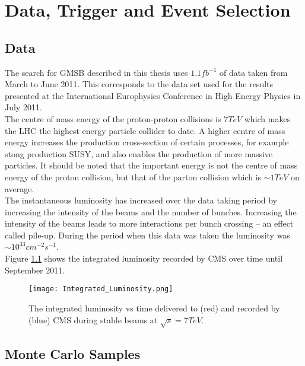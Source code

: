\chapter{Data, Trigger and Event Selection}

\section{Data}

The search for GMSB described in this thesis uses $1.1 \unit{fb^{-1}}$ of data 
taken from March to June 2011. This corresponds to the data set used for the 
results presented at the International Europhysics Conference in High Energy 
Physics in July 2011. \\

The centre of mass energy of the proton-proton collisions is $7\unit{TeV}$ which
makes the LHC the highest energy particle collider to date. A higher centre of 
mass energy increases the production cross-section of certain processes, for 
example stong production SUSY, and also enables the production of more massive 
particles. It should be noted that the important energy is not the centre of 
mass energy of the proton collision, but that of the parton collision which is 
$\sim 1 \unit{TeV}$ on average. \\

The instantaneous luminosity has increased over the data taking period by 
increasing the intensity of the beams and the number of bunches. Increasing the 
intensity of the beams leads to more interactions per bunch crossing -- an 
effect called pile-up. During the period when this data was taken the luminosity 
was $\sim 10^{33} \unit{cm^{-2}s^{-1}}$. \\

Figure \ref{fig:intlumi} shows the integrated luminosity recorded by CMS over 
time until September 2011. \\

\begin{figure}
\begin{center}
\texttt{[image: Integrated\_Luminosity.png]}
\caption{The integrated luminosity vs time delivered to (red) and recorded by
(blue) CMS during stable beams at $\sqrt{s} = 7 \unit{TeV}$.}
\end{center}
\label{fig:intlumi}
\end{figure}

\section{Monte Carlo Samples}
\label{sec:Monte_Carlo_Samples}

